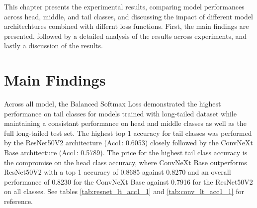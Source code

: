 This chapter presents the experimental results, comparing model performances across head, middle, and tail classes, and discussing the impact of different model architechtures combined with differnt loss functions. First, the main findings are presented, followed by a detailed analysis of the results across experiments, and lastly a discussion of the results. 


\section{Main Findings}

Across all model, the Balanced Softmax Loss demonstrated the highest performance on tail classes for models trained with long-tailed dataset while maintaining a consistant performance on head and middle classes as well as the full long-tailed test set. The highest top 1 accuracy for tail classes was performed by the ResNet50V2 architecture (Acc1: 0.6053) closely followed by the ConvNeXt Base architecture (Acc1: 0.5789). The price for the highest tail class accuracy is the compromise on the head class accuracy, where ConvNeXt Base outperforms ResNet50V2 with a top 1 accuracy of 0.8685 against 0.8270 and an overall performance of 0.8230 for the ConvNeXt Base against 0.7916 for the ResNet50V2 on all classes. See tables \ref{tab:resnet_lt_acc1_1} and \ref{tab:conv_lt_acc1_1} for reference.


